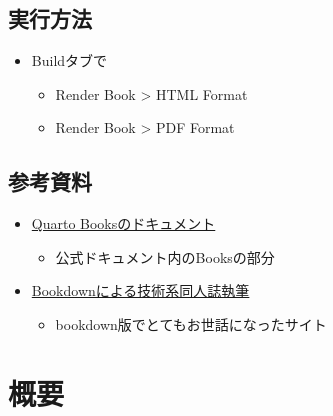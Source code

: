 \documentclass[
  b5paper,
  xelatex, ja=standard]{bxjsbook}
\providecommand{\tightlist}{%
  \setlength{\itemsep}{0pt}\setlength{\parskip}{0pt}}\usepackage{longtable,booktabs,array}
\begin{document}
\subsection*{実行方法}\label{ux5b9fux884cux65b9ux6cd5}

\begin{itemize}
\tightlist
\item
  Buildタブで

  \begin{itemize}
  \tightlist
  \item
    Render Book \textgreater{} HTML Format
  \item
    Render Book \textgreater{} PDF Format
  \end{itemize}
\end{itemize}

\subsection*{参考資料}\label{ux53c2ux8003ux8cc7ux6599}

\begin{itemize}
\tightlist
\item
  \href{https://quarto.org/docs/books/}{Quarto Booksのドキュメント}

  \begin{itemize}
  \tightlist
  \item
    公式ドキュメント内のBooksの部分
  \end{itemize}
\item
  \href{https://teastat.blogspot.com/2019/01/bookdown.html}{Bookdownによる技術系同人誌執筆}

  \begin{itemize}
  \tightlist
  \item
    bookdown版でとてもお世話になったサイト
  \end{itemize}
\end{itemize}

\section*{概要}\label{ux6982ux8981}

\end{document}
